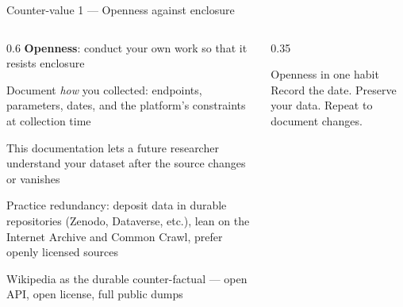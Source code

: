 \documentclass[9pt,aspectratio=169]{beamer}
\begin{document}
\begin{frame}{Counter-value 1 --- Openness against enclosure}
    \begin{columns}[T]
        \begin{column}{0.6\textwidth}
            \textbf{Openness}: conduct your own work so that it resists enclosure

            \medskip
            
            Document \textit{how} you collected: endpoints, parameters, dates, and the platform's constraints at collection time

            \medskip
            
            This documentation lets a future researcher understand your dataset after the source changes or vanishes

            \medskip
            
            Practice redundancy: deposit data in durable repositories (Zenodo, Dataverse, etc.), lean on the Internet Archive and Common Crawl, prefer openly licensed sources

            \medskip
            
            Wikipedia as the durable counter-factual --- open API, open license, full public dumps
            
        \end{column}
        \begin{column}{0.35\textwidth}
            \begin{alertblock}{Openness in one habit}
                \small Record the date. Preserve your data. Repeat to document changes.
            \end{alertblock}
        \end{column}
    \end{columns}
\end{frame}
\end{document}
